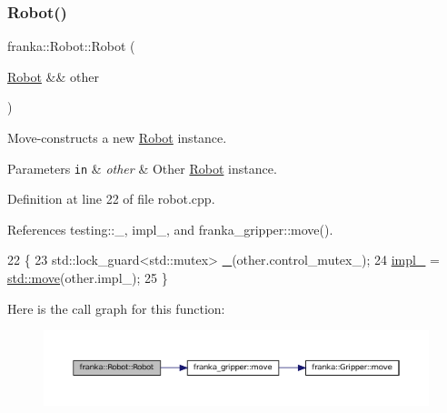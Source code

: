 \subsubsection{\texorpdfstring{Robot()}{Robot()}\hspace{0.1cm}{\footnotesize\ttfamily [2/2]}}
{\footnotesize\ttfamily franka\+::\+Robot\+::\+Robot (\begin{DoxyParamCaption}\item[{\hyperlink{classfranka_1_1Robot}{Robot} \&\&}]{other }\end{DoxyParamCaption})\hspace{0.3cm}{\ttfamily [noexcept]}}

Move-\/constructs a new \hyperlink{classfranka_1_1Robot}{Robot} instance.


\begin{DoxyParams}[1]{Parameters}
\mbox{\tt in}  & {\em other} & Other \hyperlink{classfranka_1_1Robot}{Robot} instance. \\
\hline
\end{DoxyParams}


Definition at line 22 of file robot.\+cpp.



References testing\+::\+\_\+, impl\+\_\+, and franka\+\_\+gripper\+::move().


\begin{DoxyCode}
22                                    \{
23   std::lock\_guard<std::mutex> \hyperlink{namespacetesting_a4ba77a3f5b67166ff1b59d96a32346a2}{\_}(other.control\_mutex\_);
24   \hyperlink{classfranka_1_1Robot_aca155054184e5b6478942fd6a1b82ba4}{impl\_} = \hyperlink{namespacefranka__gripper_a1356a87108d2229401d3755bd3e53bdf}{std::move}(other.impl\_);
25 \}
\end{DoxyCode}
Here is the call graph for this function\+:
\nopagebreak
\begin{figure}[H]
\begin{center}
\leavevmode
\includegraphics[width=350pt]{classfranka_1_1Robot_a378d415475336082e81a35b9811dc6c2_cgraph}
\end{center}
\end{figure}
\mbox{\label{classfranka_1_1Robot_a28abb25d25b5a1ce4463e32a518682e4}} 
